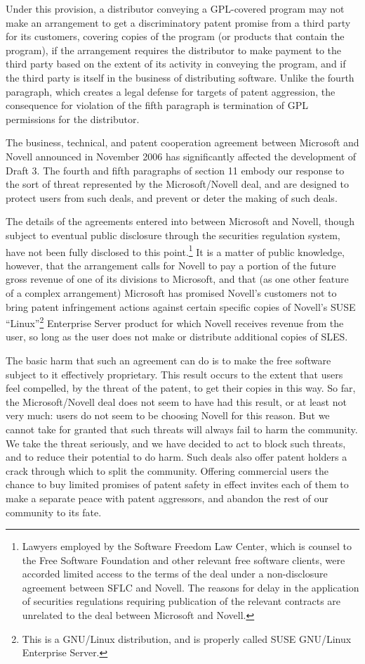 Under this provision, a distributor conveying a GPL-covered program may
not make an arrangement to get a discriminatory patent promise from a
third party for its customers, covering copies of the program (or
products that contain the program), if the arrangement requires the
distributor to make payment to the third party based on the extent of
its activity in conveying the program, and if the third party is itself
in the business of distributing software. Unlike the fourth paragraph,
which creates a legal defense for targets of patent aggression, the
consequence for violation of the fifth paragraph is termination of GPL
permissions for the distributor.

The business, technical, and patent cooperation agreement between
Microsoft and Novell announced in November 2006 has significantly
affected the development of Draft 3.  The fourth and fifth paragraphs of
section 11 embody our response to the sort of threat represented by the
Microsoft/Novell deal, and are designed to protect users from such
deals, and prevent or deter the making of such deals.

The details of the agreements entered into between Microsoft and Novell,
though subject to eventual public disclosure through the securities
regulation system, have not been fully disclosed to this
point.\footnote{Lawyers employed by the Software Freedom Law Center,
which is counsel to the Free Software Foundation and other relevant free
software clients, were accorded limited access to the terms of the deal
under a non-disclosure agreement between SFLC and Novell.  The reasons
for delay in the application of securities regulations requiring
publication of the relevant contracts are unrelated to the deal between
Microsoft and Novell.}  It is a matter of public knowledge, however,
that the arrangement calls for Novell to pay a portion of the future
gross revenue of one of its divisions to Microsoft, and that (as one
other feature of a complex arrangement) Microsoft has promised Novell's
customers not to bring patent infringement actions against certain
specific copies of Novell's SUSE ``Linux''\footnote{This is a GNU/Linux
distribution, and is properly called SUSE GNU/Linux Enterprise Server.}
Enterprise Server product for which Novell receives revenue from the
user, so long as the user does not make or distribute additional copies
of SLES.

The basic harm that such an agreement can do is to make the free
software subject to it effectively proprietary.  This result occurs to
the extent that users feel compelled, by the threat of the patent, to
get their copies in this way.  So far, the Microsoft/Novell deal does
not seem to have had this result, or at least not very much: users do
not seem to be choosing Novell for this reason.  But we cannot take for
granted that such threats will always fail to harm the community.  We
take the threat seriously, and we have decided to act to block such
threats, and to reduce their potential to do harm.  Such deals also
offer patent holders a crack through which to split the community.
Offering commercial users the chance to buy limited promises of patent
safety in effect invites each of them to make a separate peace with
patent aggressors, and abandon the rest of our community to its fate.

